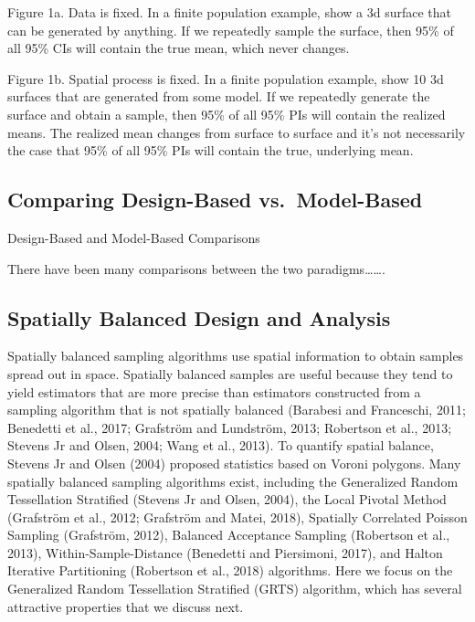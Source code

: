 \documentclass[]{elsarticle} %
\begin{document}
Figure 1a. Data is fixed. In a finite population example, show a 3d
surface that can be generated by anything. If we repeatedly sample the
surface, then 95\% of all 95\% CIs will contain the true mean, which
never changes.

Figure 1b. Spatial process is fixed. In a finite population example,
show 10 3d surfaces that are generated from some model. If we repeatedly
generate the surface and obtain a sample, then 95\% of all 95\% PIs will
contain the realized means. The realized mean changes from surface to
surface and it's not necessarily the case that 95\% of all 95\% PIs will
contain the true, underlying mean.

\hypertarget{comparing-design-based-vs.-model-based}{%
\subsection{Comparing Design-Based
vs.~Model-Based}\label{comparing-design-based-vs.-model-based}}

Design-Based and Model-Based Comparisons

There have been many comparisons between the two paradigms\ldots\ldots.

\hypertarget{spatially-balanced-design-and-analysis}{%
\subsection{Spatially Balanced Design and
Analysis}\label{spatially-balanced-design-and-analysis}}

Spatially balanced sampling algorithms use spatial information to obtain
samples spread out in space. Spatially balanced samples are useful
because they tend to yield estimators that are more precise than
estimators constructed from a sampling algorithm that is not spatially
balanced (Barabesi and Franceschi, 2011; Benedetti et al., 2017;
Grafström and Lundström, 2013; Robertson et al., 2013; Stevens Jr and
Olsen, 2004; Wang et al., 2013). To quantify spatial balance, Stevens Jr
and Olsen (2004) proposed statistics based on Voroni polygons. Many
spatially balanced sampling algorithms exist, including the Generalized
Random Tessellation Stratified (Stevens Jr and Olsen, 2004), the Local
Pivotal Method (Grafström et al., 2012; Grafström and Matei, 2018),
Spatially Correlated Poisson Sampling (Grafström, 2012), Balanced
Acceptance Sampling (Robertson et al., 2013), Within-Sample-Distance
(Benedetti and Piersimoni, 2017), and Halton Iterative Partitioning
(Robertson et al., 2018) algorithms. Here we focus on the Generalized
Random Tessellation Stratified (GRTS) algorithm, which has several
attractive properties that we discuss next.
\end{document}
